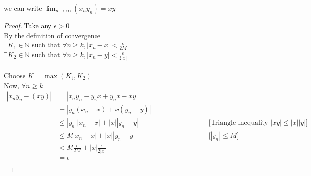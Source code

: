 \documentclass{article}
\newcommand{\hs}{\hspace}
\begin{document}
\begin{theorem}{}{}
    we can write $\displaystyle\lim_{n\to\infty}(x_ny_n)=xy$
\begin{proof}
    Take any $\epsilon >0$\\ By the definition of convergence\\
    $\exists K_1 \in \mathbb{N}$\; such that $\forall n \geq k, |x_n-x|<\frac{\epsilon}{2M}$\\
    $\exists K_2 \in \mathbb{N}$\; such that $\forall n \geq k, |x_n-y|<\frac{\epsilon}{2|x|}$\\\\
    Choose $K=\max(K_1,K_2)$\\Now, $\forall n\geq k$\\
    \begin{align*}
        |x_ny_n-(xy)|
         & =|x_ny_n-y_nx+y_nx-xy| \hs{4cm}                                                                 \\
         & =|y_n(x_n-x)+x(y_n-y)|                                                                          \\
         & \leq |y_n||x_n-x|+|x||y_n-y|                    & \text{[Triangle Inequality $|xy|\leq|x||y|$]} \\
         & \leq M |x_n-x|+|x||y_n-y|                       & \text{[$|y_n|\leq M$]}                        \\
         & < M\frac{\epsilon}{2M}+|x|\frac{\epsilon}{2|x|}                                                 \\
         & =\epsilon                                                                                       \\
    \end{align*}
\end{proof}
\end{theorem}
\end{document}
